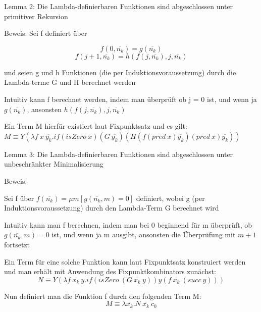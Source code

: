 \documentclass[10pt]{article}
\begin{document}
\begin{itemize*}
  \item  \color{blue} Lemma 2: Die Lambda-definierbaren Funktionen sind abgeschlossen unter primitiver Rekursion \color{black}
  \item Beweis: Sei f definiert über
  \begin{center}
    $$f(0,\overline{n_k}) = g(\overline{n_k})$$
    $$f(j+1, \overline{n_k}) = h(f(j, \overline{n_k}),j,\overline{n_k})$$
  \end{center}
  und seien g und h Funktionen (die per Induktionsvoraussetzung) durch die Lambda-terme G und H berechnet werden
  \begin{itemize*}
    \item Intuitiv kann f berechnet werden, indem man überprüft ob j = 0 ist, und wenn ja $g(\overline{n_k})$, ansonsten $h(f(j, \overline{n_k}),j,\overline{n_k})$
    \item Ein Term M hierfür existiert laut Fixpunktsatz und es gilt:
    $M \equiv Y (\lambda f\:x\: \overline{y_k}.if(isZero \: x)(G\:\overline{y_k})(H(f(pred\: x)\overline{y_k})(pred \: x)\overline{y_k}))$
  \end{itemize*}
\end{itemize*}

\begin{itemize*}
  \item \color{blue} Lemma 3: Die Lambda-definierbaren Funktionen sind abgeschlossen unter unbeschränkter Minimalisierung \color{black}
  \item Beweis:
  \begin{itemize*}
    \item Sei f über $f(\overline{n_k}) = \mu m[g(\overline{n_k},m) = 0]$ definiert, wobei g (per Induktionsvoraussetzung) durch den Lambda-Term G berechnet wird
    \item Intuitiv kann man f berechnen, indem man bei 0 beginnend für m überprüft, ob $g(\overline{n_k},m) = 0$ ist, und wenn ja m ausgibt, ansonsten die Überprüfung mit $m+1$ fortsetzt
    \item Ein Term für eine solche Funktion kann laut Fixpunktsatz konstruiert werden und man erhält mit Anwendung des Fixpunktkombinators zunächst: $$N \equiv Y (\lambda f \: \overline{x_k} \: y. if(isZero \: (G \: \overline{x_k} \: y))y(f\:\overline{x_k}\:(succ \: y)))$$
    \item Nun definiert man die Funktion f durch den folgenden Term M: $$M \equiv \lambda \overline{x_k}.N \: \overline{x_k} \: c_0$$
  \end{itemize*}
\end{itemize*}
\end{document}
